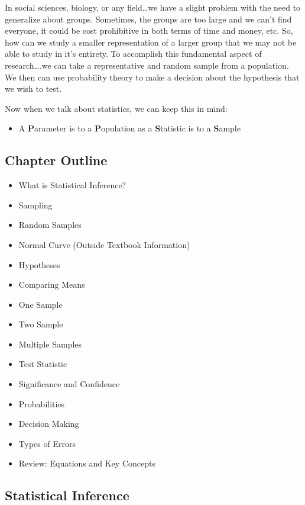 \documentclass[]{article}
\begin{document}
In social sciences, biology, or any field\ldots{}we have a slight
problem with the need to generalize about groups. Sometimes, the groups
are too large and we can't find everyone, it could be cost prohibitive
in both terms of time and money, etc. So, how can we study a smaller
representation of a larger group that we may not be able to study in
it's entirety. To accomplish this fundamental aspect of
research\ldots{}.we can take a representative and random sample from a
population. We then can use probability theory to make a decision about
the hypothesis that we wish to test.

Now when we talk about statistics, we can keep this in mind:

\begin{itemize}
\itemsep1pt\parskip0pt
\item
  A \textbf{P}arameter is to a \textbf{P}opulation as a
  \textbf{S}tatistic is to a \textbf{S}ample
\end{itemize}

\subsection{Chapter Outline}\label{chapter-outline}

\begin{itemize}
\itemsep1pt\parskip0pt
\item
  What is Statistical Inference?
\item
  Sampling
\item
  Random Samples
\item
  Normal Curve (Outside Textbook Information)
\item
  Hypotheses
\item
  Comparing Means
\item
  One Sample
\item
  Two Sample
\item
  Multiple Samples
\item
  Test Statistic
\item
  Significance and Confidence
\item
  Probabilities
\item
  Decision Making
\item
  Types of Errors
\item
  Review: Equations and Key Concepts
\end{itemize}

\subsection{Statistical Inference}\label{statistical-inference}
\end{document}

